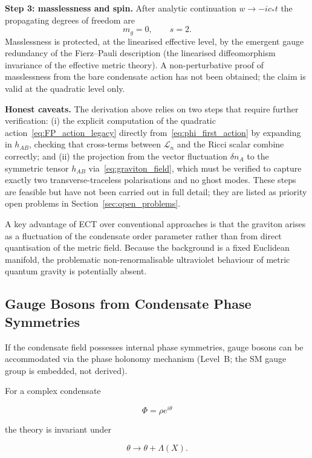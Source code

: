 \documentclass[11pt,a4paper]{article}
\numberwithin{equation}{section}
\begin{document}
\textbf{Step 3: masslessness and spin.}
After analytic continuation $w\to-ic_*t$ the propagating degrees of
freedom are
\begin{equation}
m_g = 0, \qquad s = 2.
\end{equation}
Masslessness is protected, at the linearised effective level,
by the emergent gauge redundancy of the Fierz--Pauli description
(the linearised diffeomorphism invariance of the effective metric theory).
A non-perturbative proof of masslessness from the bare condensate action
has not been obtained; the claim is valid at the quadratic level only.

\textbf{Honest caveats.}
The derivation above relies on two steps that require further
verification: (i) the explicit computation of the quadratic
action~\eqref{eq:FP_action_legacy} directly from~\eqref{eq:phi_first_action}
by expanding in $h_{AB}$, checking that cross-terms between
$\mathcal{L}_n$ and the Ricci scalar combine correctly; and
(ii) the projection from the vector fluctuation $\delta n_A$
to the symmetric tensor $h_{AB}$ via~\eqref{eq:graviton_field},
which must be verified to capture exactly two transverse-traceless
polarisations and no ghost modes.  These steps are feasible but
have not been carried out in full detail; they are listed as
priority open problems in Section~\ref{sec:open_problems}.

A key advantage of ECT over conventional approaches is that the
graviton arises as a fluctuation of the condensate order parameter
rather than from direct quantisation of the metric field.  Because
the background is a fixed Euclidean manifold, the problematic
non-renormalisable ultraviolet behaviour of metric quantum gravity
is potentially absent.

\subsection{Gauge Bosons from Condensate Phase Symmetries}

If the condensate field possesses internal phase symmetries, gauge bosons can be accommodated via the phase holonomy mechanism (Level~B; the SM gauge group is embedded, not derived).

For a complex condensate

\begin{equation}
\Phi = \rho e^{i\theta}
\end{equation}

the theory is invariant under

\begin{equation}
\theta \rightarrow \theta + \Lambda(X).
\end{equation}
\end{document}
